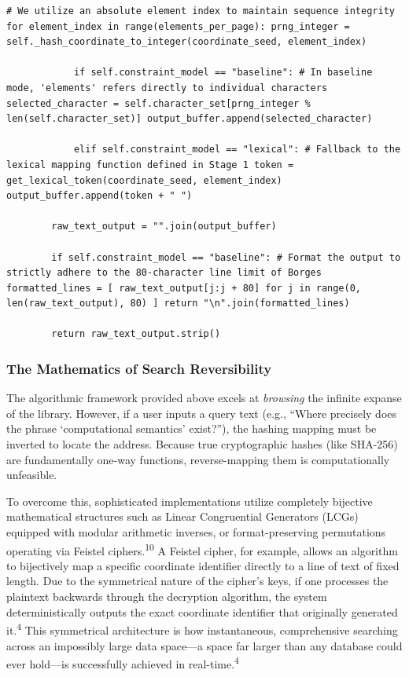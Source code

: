 \documentclass[
  11pt,
  a4paper,
]{article}
\begin{document}
\begin{lstlisting}[style=babelpython]
        # We utilize an absolute element index to maintain sequence integrity for element_index in range(elements_per_page): prng_integer = self._hash_coordinate_to_integer(coordinate_seed, element_index)

            if self.constraint_model == "baseline": # In baseline mode, 'elements' refers directly to individual characters selected_character = self.character_set[prng_integer % len(self.character_set)] output_buffer.append(selected_character)

            elif self.constraint_model == "lexical": # Fallback to the lexical mapping function defined in Stage 1 token = get_lexical_token(coordinate_seed, element_index) output_buffer.append(token + " ")

        raw_text_output = "".join(output_buffer)

        if self.constraint_model == "baseline": # Format the output to strictly adhere to the 80-character line limit of Borges formatted_lines = [ raw_text_output[j:j + 80] for j in range(0, len(raw_text_output), 80) ] return "\n".join(formatted_lines)

        return raw_text_output.strip() \end{lstlisting}

\subsubsection{The Mathematics of Search Reversibility}\label{the-mathematics-of-search-reversibility}

The algorithmic framework provided above excels at \emph{browsing} the infinite expanse of the library. However, if a user inputs a query text (e.g., ``Where precisely does the phrase `computational semantics' exist?''), the hashing mapping must be inverted to locate the address. Because true cryptographic hashes (like SHA-256) are fundamentally one-way functions, reverse-mapping them is computationally unfeasible.

To overcome this, sophisticated implementations utilize completely bijective mathematical structures such as Linear Congruential Generators (LCGs) equipped with modular arithmetic inverses, or format-preserving permutations operating via Feistel ciphers.\textsuperscript{10} A Feistel cipher, for example, allows an algorithm to bijectively map a specific coordinate identifier directly to a line of text of fixed length. Due to the symmetrical nature of the cipher's keys, if one processes the plaintext backwards through the decryption algorithm, the system deterministically outputs the exact coordinate identifier that originally generated it.\textsuperscript{4} This symmetrical architecture is how instantaneous, comprehensive searching across an impossibly large data space---a space far larger than any database could ever hold---is successfully achieved in real-time.\textsuperscript{4}
\end{document}
